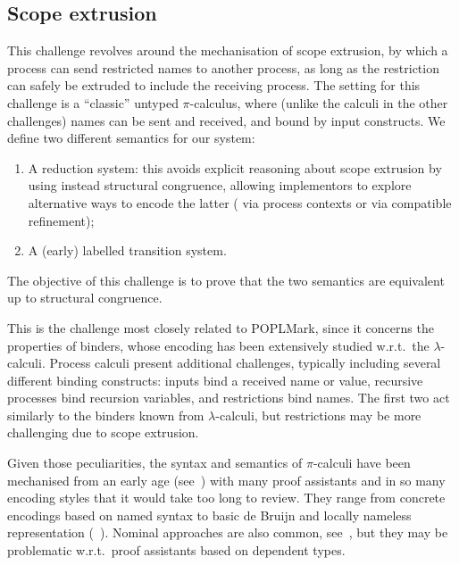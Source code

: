 \documentclass[runningheads]{llncs}
\begin{document}
\subsection{Scope extrusion}
This challenge revolves around the mechanisation of %
scope
extrusion, by which a process can send restricted names to another
process, as long as the restriction can safely be extruded to include
the receiving process.  The setting for this challenge is a
``classic'' untyped \( \pi \)-calculus, where (unlike the calculi in
the other challenges) names can be sent and received, and bound by
input constructs.  We define two different semantics for our system:
\begin{enumerate}
\item A reduction system: this avoids explicit reasoning about scope
  extrusion by using instead structural congruence, allowing
  implementors to explore alternative ways to encode the latter (\eg
  via process contexts or via compatible refinement);
\item A (early) labelled transition system.
\end{enumerate}
The objective of this
challenge is to prove that the two semantics are equivalent up to
structural congruence.

This is the challenge most closely related to  POPLMark, 
since it concerns the properties of binders, whose encoding has been
extensively studied w.r.t.\ the $\lambda$-calculi. Process calculi
present additional challenges,  typically including several
different binding constructs: inputs bind a received name or value,
recursive processes bind recursion variables, and restrictions bind
names.  The first two act similarly to the binders known from
$\lambda$-calculi, but restrictions may be more challenging due to
scope extrusion.

Given those peculiarities, the syntax and semantics of $\pi$-calculi have been
mechanised from an early age (see~\cite{Melham1994}) with many proof
assistants and in so many encoding styles that it would take too long to
review.  They range from concrete encodings based on named syntax
\cite{Melham1994} to basic de Bruijn  and locally nameless
representation%
(\eg~\cite{Castro2020}).
Nominal approaches are also common, see~\cite{Bengtson2009}, but they
may be problematic w.r.t.~proof assistants based on dependent types.
\end{document}
